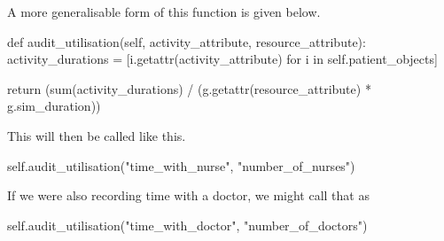 \documentclass[
  letterpaper,
  DIV=11,
  numbers=noendperiod]{scrreprt}
\newenvironment{Shaded}{\begin{snugshade}}{\end{snugshade}}
\newcommand{\BuiltInTok}[1]{\textcolor[rgb]{0.00,0.23,0.31}{#1}}
\newcommand{\ControlFlowTok}[1]{\textcolor[rgb]{0.00,0.23,0.31}{#1}}
\newcommand{\KeywordTok}[1]{\textcolor[rgb]{0.00,0.23,0.31}{#1}}
\newcommand{\NormalTok}[1]{\textcolor[rgb]{0.00,0.23,0.31}{#1}}
\newcommand{\OperatorTok}[1]{\textcolor[rgb]{0.37,0.37,0.37}{#1}}
\newcommand{\StringTok}[1]{\textcolor[rgb]{0.13,0.47,0.30}{#1}}
\newcommand{\VariableTok}[1]{\textcolor[rgb]{0.07,0.07,0.07}{#1}}
\begin{document}
\begin{tcolorbox}[enhanced jigsaw, rightrule=.15mm, colback=white, colframe=quarto-callout-tip-color-frame, colbacktitle=quarto-callout-tip-color!10!white, toprule=.15mm, coltitle=black, opacityback=0, titlerule=0mm, bottomtitle=1mm, breakable, title=\textcolor{quarto-callout-tip-color}{\faLightbulb}\hspace{0.5em}{Tip}, opacitybacktitle=0.6, toptitle=1mm, arc=.35mm, bottomrule=.15mm, leftrule=.75mm, left=2mm]

A more generalisable form of this function is given below.

\begin{Shaded}
\begin{Highlighting}[]
\KeywordTok{def}\NormalTok{ audit\_utilisation(}\VariableTok{self}\NormalTok{, activity\_attribute, resource\_attribute):}
\NormalTok{    activity\_durations }\OperatorTok{=}\NormalTok{ [i.}\BuiltInTok{getattr}\NormalTok{(activity\_attribute) }\ControlFlowTok{for}\NormalTok{ i }\KeywordTok{in} \VariableTok{self}\NormalTok{.patient\_objects]}

    \ControlFlowTok{return}\NormalTok{ (}\BuiltInTok{sum}\NormalTok{(activity\_durations) }\OperatorTok{/}\NormalTok{ (g.}\BuiltInTok{getattr}\NormalTok{(resource\_attribute) }\OperatorTok{*}\NormalTok{ g.sim\_duration))}
\end{Highlighting}
\end{Shaded}

This will then be called like this.

\begin{Shaded}
\begin{Highlighting}[]
\VariableTok{self}\NormalTok{.audit\_utilisation(}\StringTok{"time\_with\_nurse"}\NormalTok{, }\StringTok{"number\_of\_nurses"}\NormalTok{)}
\end{Highlighting}
\end{Shaded}

If we were also recording time with a doctor, we might call that as

\begin{Shaded}
\begin{Highlighting}[]
\VariableTok{self}\NormalTok{.audit\_utilisation(}\StringTok{"time\_with\_doctor"}\NormalTok{, }\StringTok{"number\_of\_doctors"}\NormalTok{)}
\end{Highlighting}
\end{Shaded}

\end{tcolorbox}
\end{document}
